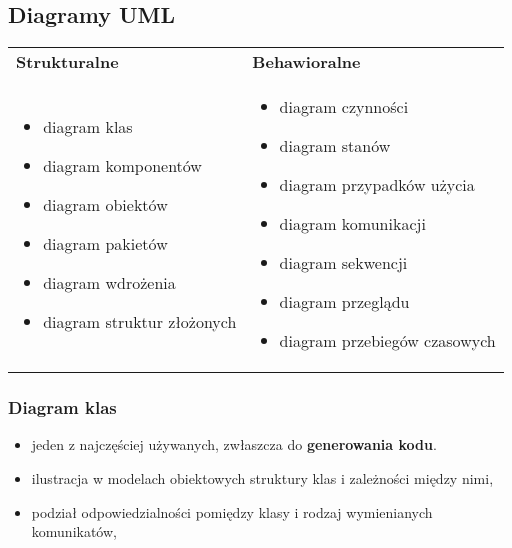 \documentclass[../main.tex]{subfiles}
\begin{document}
    \subsection{Diagramy UML}
    \begin{table}[H]
        \begin{center}
            \begin{tabular}{  p{8cm} p{8cm} }
                \toprule
                \textbf{Strukturalne} & \textbf{Behawioralne}\\

                \cmidrule(r){1-1}\cmidrule(r){2-2}

                \begin{itemize}
                    \item diagram klas
                    \item diagram komponentów
                    \item diagram obiektów
                    \item diagram pakietów
                    \item diagram wdrożenia
                    \item diagram struktur złożonych
                \end{itemize}
                &
                \begin{itemize}
                    \item diagram czynności
                    \item diagram stanów
                    \item diagram przypadków użycia
                    \item diagram komunikacji
                    \item diagram sekwencji
                    \item diagram przeglądu
                    \item diagram przebiegów czasowych
                \end{itemize}
                \\

                \bottomrule
            \end{tabular}
        \end{center}
    \end{table}


    \subsubsection{Diagram klas}
    \begin{itemize}
        \item jeden z najczęściej używanych, zwłaszcza do \textbf{generowania kodu}.
        \item ilustracja w modelach obiektowych struktury klas i zależności między nimi,
        \item podział odpowiedzialności pomiędzy klasy i rodzaj wymienianych komunikatów,
    \end{itemize}
\end{document}
